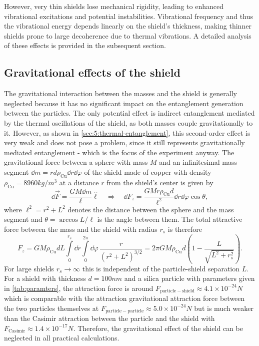 However, very thin shields lose mechanical rigidity, leading to enhanced vibrational excitations and potential instabilities.
Vibrational frequency and thus the vibrational energy depends linearly on the shield's thickness, making thinner shields prone to large decoherence due to thermal vibrations.
A detailed analysis of these effects is provided in the subsequent section.



\subsection{Gravitational effects of the shield}\label{subsec:5:shield-gravitation}
The gravitational interaction between the masses and the shield is generally neglected because it has no significant impact on the entanglement generation between the particles.
The only potential effect is indirect entanglement mediated by the thermal oscillations of the shield, as both masses couple gravitationally to it. 
However, as shown in \cref{sec:5:thermal-entanglement}, this second-order effect is very weak and does not pose a problem, since it still represents gravitationally mediated entanglement - which is the focus of the experiment anyway.
The gravitational force between a sphere with mass $M$ and an infinitesimal mass segment $\dd m = r d \rho_\mathrm{Cu} \dd r \dd \varphi$ of the shield made of copper with density $\rho_\mathrm{Cu} = 8960\si{kg/m^3}$ at a distance $r$ from the shield's center is given by
\begin{equation}
  \dd \vec{F} = \frac{G M \dd m}{\ell} \boldsymbol{\hat{\ell}} 
  \quad \Rightarrow \quad
  \dd F_z = \frac{G M r \rho_\mathrm{Cu} d}{\ell^2} \dd r \dd \varphi \cos \theta,
\end{equation}
where $\ell^2 = r^2 + L^2$ denotes the distance between the sphere and the mass segment and $\theta = \arccos L/\ell$ is the angle between them.
The total attractive force between the mass and the shield with radius $r_s$ is therefore
\begin{equation}
  F_z = GM \rho_\mathrm{Cu} d L \int\limits_{0}^{r_s} \dd r \int\limits_{0}^{2\pi} \dd \varphi \, \frac{r}{(r^2 + L^2)^{3/2}} = 2\pi G M \rho_\mathrm{Cu} d \left(1 - \frac{L}{\sqrt{L^2 + r_s^2}}\right) .
\end{equation}
For large shields $r_s \rightarrow \infty$ this is independent of the particle-shield separation $L$.
For a shield with thickness $d = 100\si{nm}$ and a silica particle with parameters given in \cref{tab:paramters}, the attraction force is around $F_\mathrm{particle-shield} \approx 4.1\times 10^{-24} \si{N}$ which is comparable with the attraction gravitational attraction force between the two particles themselves at $F_\mathrm{particle-particle} \approx 5.0 \times 10^{-24}\si{N}$ but is much weaker than the Casimir attraction between the particle and the shield with $F_\mathrm{Casimir} \approx 1.4 \times 10^{-17} \si{N}$.
Therefore, the gravitational effect of the shield can be neglected in all practical calculations.
